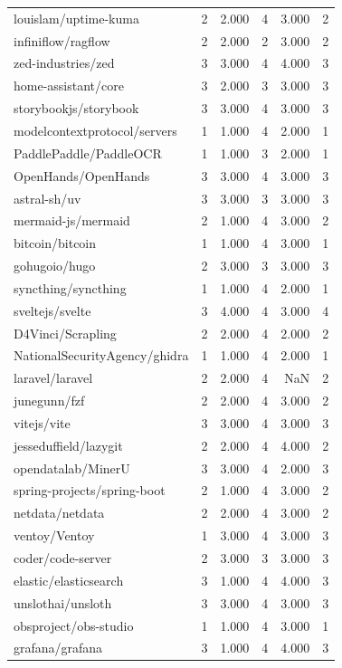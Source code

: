 \begin{tabular}{lrrrrr}
louislam/uptime-kuma & 2 & 2.000 & 4 & 3.000 & 2 \\
infiniflow/ragflow & 2 & 2.000 & 2 & 3.000 & 2 \\
zed-industries/zed & 3 & 3.000 & 4 & 4.000 & 3 \\
home-assistant/core & 3 & 2.000 & 3 & 3.000 & 3 \\
storybookjs/storybook & 3 & 3.000 & 4 & 3.000 & 3 \\
modelcontextprotocol/servers & 1 & 1.000 & 4 & 2.000 & 1 \\
PaddlePaddle/PaddleOCR & 1 & 1.000 & 3 & 2.000 & 1 \\
OpenHands/OpenHands & 3 & 3.000 & 4 & 3.000 & 3 \\
astral-sh/uv & 3 & 3.000 & 3 & 3.000 & 3 \\
mermaid-js/mermaid & 2 & 1.000 & 4 & 3.000 & 2 \\
bitcoin/bitcoin & 1 & 1.000 & 4 & 3.000 & 1 \\
gohugoio/hugo & 2 & 3.000 & 3 & 3.000 & 3 \\
syncthing/syncthing & 1 & 1.000 & 4 & 2.000 & 1 \\
sveltejs/svelte & 3 & 4.000 & 4 & 3.000 & 4 \\
D4Vinci/Scrapling & 2 & 2.000 & 4 & 2.000 & 2 \\
NationalSecurityAgency/ghidra & 1 & 1.000 & 4 & 2.000 & 1 \\
laravel/laravel & 2 & 2.000 & 4 & NaN & 2 \\
junegunn/fzf & 2 & 2.000 & 4 & 3.000 & 2 \\
vitejs/vite & 3 & 3.000 & 4 & 3.000 & 3 \\
jesseduffield/lazygit & 2 & 2.000 & 4 & 4.000 & 2 \\
opendatalab/MinerU & 3 & 3.000 & 4 & 2.000 & 3 \\
spring-projects/spring-boot & 2 & 1.000 & 4 & 3.000 & 2 \\
netdata/netdata & 2 & 2.000 & 4 & 3.000 & 2 \\
ventoy/Ventoy & 1 & 3.000 & 4 & 3.000 & 3 \\
coder/code-server & 2 & 3.000 & 3 & 3.000 & 3 \\
elastic/elasticsearch & 3 & 1.000 & 4 & 4.000 & 3 \\
unslothai/unsloth & 3 & 3.000 & 4 & 3.000 & 3 \\
obsproject/obs-studio & 1 & 1.000 & 4 & 3.000 & 1 \\
grafana/grafana & 3 & 1.000 & 4 & 4.000 & 3 \\

\end{tabular}
